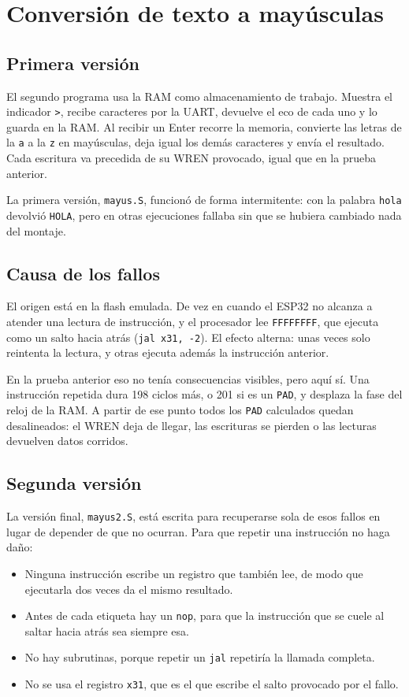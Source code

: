 \documentclass[11pt,letterpaper,oneside]{report}
\newcommand{\code}[1]{\texttt{#1}}
\begin{document}
\section{Conversión de texto a mayúsculas}

\subsection{Primera versión}

El segundo programa usa la RAM como almacenamiento de trabajo. Muestra el indicador \code{>}, recibe caracteres por la UART, devuelve el eco de cada uno y lo guarda en la RAM. Al recibir un Enter recorre la memoria, convierte las letras de la \code{a} a la \code{z} en mayúsculas, deja igual los demás caracteres y envía el resultado. Cada escritura va precedida de su WREN provocado, igual que en la prueba anterior.

La primera versión, \code{mayus.S}, funcionó de forma intermitente: con la palabra \code{hola} devolvió \code{HOLA}, pero en otras ejecuciones fallaba sin que se hubiera cambiado nada del montaje.

\subsection{Causa de los fallos}

El origen está en la flash emulada. De vez en cuando el ESP32 no alcanza a atender una lectura de instrucción, y el procesador lee \code{FFFFFFFF}, que ejecuta como un salto hacia atrás (\code{jal x31, -2}). El efecto alterna: unas veces solo reintenta la lectura, y otras ejecuta además la instrucción anterior.

En la prueba anterior eso no tenía consecuencias visibles, pero aquí sí. Una instrucción repetida dura 198 ciclos más, o 201 si es un \code{PAD}, y desplaza la fase del reloj de la RAM. A partir de ese punto todos los \code{PAD} calculados quedan desalineados: el WREN deja de llegar, las escrituras se pierden o las lecturas devuelven datos corridos.

\subsection{Segunda versión}

La versión final, \code{mayus2.S}, está escrita para recuperarse sola de esos fallos en lugar de depender de que no ocurran. Para que repetir una instrucción no haga daño:

\begin{itemize}
  \item Ninguna instrucción escribe un registro que también lee, de modo que ejecutarla dos veces da el mismo resultado.
  \item Antes de cada etiqueta hay un \code{nop}, para que la instrucción que se cuele al saltar hacia atrás sea siempre esa.
  \item No hay subrutinas, porque repetir un \code{jal} repetiría la llamada completa.
  \item No se usa el registro \code{x31}, que es el que escribe el salto provocado por el fallo.
\end{itemize}
\end{document}
